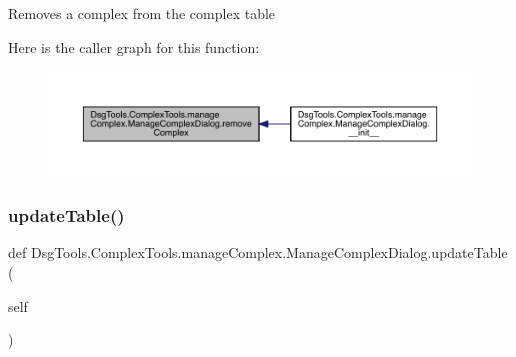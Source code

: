 \begin{DoxyVerb}Removes a complex from the complex table
\end{DoxyVerb}
 Here is the caller graph for this function\+:
\nopagebreak
\begin{figure}[H]
\begin{center}
\leavevmode
\includegraphics[width=350pt]{class_dsg_tools_1_1_complex_tools_1_1manage_complex_1_1_manage_complex_dialog_af4f067c0ad67781741a72f58d7732469_icgraph}
\end{center}
\end{figure}
\mbox{\label{class_dsg_tools_1_1_complex_tools_1_1manage_complex_1_1_manage_complex_dialog_aca5f214b97781c877690fadcd7bece00}} 
\subsubsection{\texorpdfstring{update\+Table()}{updateTable()}}
{\footnotesize\ttfamily def Dsg\+Tools.\+Complex\+Tools.\+manage\+Complex.\+Manage\+Complex\+Dialog.\+update\+Table (\begin{DoxyParamCaption}\item[{}]{self }\end{DoxyParamCaption})}

